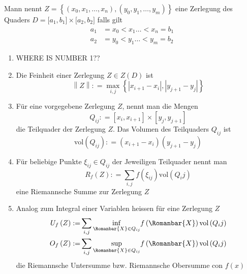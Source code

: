 \begin{definition}{9.1}
Mann nennt $Z=\left\{ \left( x_0,x_1,\dots,x_n\right), \left( y_0,y_1,\dots,y_m\right)\right\}$ eine Zerlegung des Quaders $D=\lbrack a_1,b_1\rbrack\times\lbrack a_2,b_2\rbrack$ falls gilt 
\begin{align*}
a_1&=x_0 < x_1\dots <x_n=b_1\\
a_2&=y_0 < y_1\dots <y_m=b_2
\end{align*}
\begin{enumerate}
\item WHERE IS NUMBER 1??
\item Die Feinheit einer Zerlegung $Z\in Z\left( D\right)$ ist \[\left\| Z \right\|: = \mathop {\max }\limits_{i,j} \left\{ {\left| {{x_{i + 1}} - {x_i}} \right|,\left| {{y_{j + 1}} - {y_j}} \right|} \right\}\]
\item Für eine vorgegebene Zerlegung $Z$, nennt man die Mengen \[{Q_{ij}}: = \left[ {{x_i},{x_{i + 1}}} \right] \times \left[ {{y_j},{y_{j + 1}}} \right]\] die Teilquader der Zerlegung $Z$. Das Volumen des Teilquaders $Q_{ij}$ ist \[\text{vol}\left( {{Q_{ij}}} \right): = \left( {{x_{i + 1}} - {x_i}} \right)\left( {{y_{j + 1}} - {y_j}} \right)\]
\item Für beliebige Punkte $\xi_{ij}\in Q_{ij}$ der Jeweiligen Teilquader nennt man \[{R_f}\left( Z \right): = \sum\limits_{i,j} {f\left( {{\xi _{ij}}} \right){\text{vol}}\left( {{Q_i}j} \right)} \] eine Riemannsche Summe zur Zerlegung $Z$ 
\item Analog zum Integral einer Variablen heissen für eine Zerlegung $Z$ 
\begin{align*}
{U_f}\left( Z \right): =&\sum\limits_{i,j} {\mathop {\inf }\limits_{\Romanbar{X}\in Q_{ij}} } f\left(\Romanbar{X}\right){\text{vol}}\left( {{Q_i}j} \right)\\
{O_f}\left( Z \right): =&\sum\limits_{i,j} {\mathop {\sup }\limits_{\Romanbar{X}\in Q_{ij}} } f\left(\Romanbar{X}\right){\text{vol}}\left( {{Q_i}j} \right)
\end{align*}
die Riemannsche Untersumme bzw. Riemannsche Obersumme con $f\left( x\right)$
\end{enumerate}
\end{definition}
